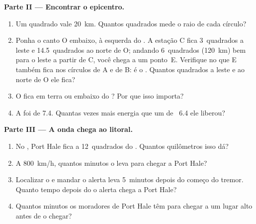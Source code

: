 \begin{problem}
\medskip
\noindent\textbf{Parte II --- Encontrar o epicentro.}\par\nopagebreak
\begin{enumerate}[resume, beginpenalty=10000]
  \item Um quadrado vale \qty{20}{km}. Quantos quadrados mede o raio de
        cada círculo?
  \item Ponha o canto O embaixo, à esquerda do . A estação C fica
        3~quadrados a leste e 14.5~quadrados ao norte de O; andando
        6~quadrados (\qty{120}{km}) bem para o leste a partir de C, você
        chega a um ponto~E. Verifique no  que E também fica nos
        círculos de A e de B: é o . Quantos quadrados a leste e
        ao norte de O ele fica?
  \item O  fica em terra ou embaixo do ? Por que isso
        importa?
  \item A  foi de 7.4. Quantas vezes mais energia que um
         de ~6.4 ele liberou?
\end{enumerate}

\medskip
\noindent\textbf{Parte III --- A onda chega ao litoral.}\par\nopagebreak
\begin{enumerate}[resume, beginpenalty=10000]
  \item No , Port Hale fica a 12~quadrados do . Quantos
        quilômetros isso dá?
  \item A \qty{800}{km/h}, quantos minutos o  leva para chegar a
        Port Hale?
  \item Localizar o  e mandar o alerta leva 5~minutos depois do
        começo do tremor. Quanto tempo depois do  o alerta chega
        a Port Hale?
  \item Quantos minutos os moradores de Port Hale têm para chegar a um
        lugar alto antes de o  chegar?
\end{enumerate}
\end{problem}
